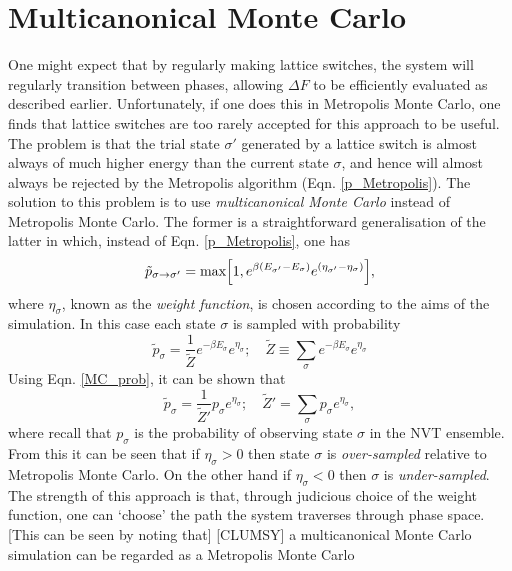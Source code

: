 \documentclass{report}
\begin{document}
\section{Multicanonical Monte Carlo}
One might expect that by regularly making lattice switches, the system will regularly transition between phases, allowing $\Delta F$ to be efficiently 
evaluated as described earlier. Unfortunately, if one does this in Metropolis Monte Carlo, one finds that lattice switches are too rarely accepted for 
this approach to be useful. 
The problem is that the trial state $\sigma'$ generated by a lattice switch is almost always of much higher energy than the current state $\sigma$, 
and hence will almost always be rejected by the Metropolis algorithm (Eqn. \eqref{p_Metropolis}). 
The solution to this problem is to use \emph{multicanonical Monte Carlo}\cite{Berg_1991,Berg_1992,Smith_1995} instead of Metropolis Monte Carlo. 
The former is a straightforward generalisation of the latter in which, instead of Eqn. \eqref{p_Metropolis}, one has
\begin{equation}\label{p_multicanonical}
\tilde{p}_{\sigma\to\sigma'}=\text{max}\Bigl[1,e^{\beta(E_{\sigma'}-E_{\sigma})}e^{(\eta_{\sigma'}-\eta_{\sigma})}\Bigr],
\end{equation}
where $\eta_{\sigma}$, known as the \emph{weight function}, is chosen according to the aims of the simulation. In this case each state $\sigma$ is 
sampled with probability
\begin{equation}\label{MCMC_prob}
\tilde{p}_{\sigma}=\frac{1}{\tilde{Z}}e^{-\beta E_{\sigma}}e^{\eta_{\sigma}}; \quad \tilde{Z}\equiv\sum_{\sigma}e^{-\beta E_{\sigma}}e^{\eta_{\sigma}}
\end{equation}
Using Eqn. \eqref{MC_prob}, it can be shown that
\begin{equation}\label{MCMC_prob_2}
\tilde{p}_{\sigma}=\frac{1}{\tilde{Z}'}p_{\sigma}e^{\eta_{\sigma}}; \quad \tilde{Z}'=\sum_{\sigma}p_{\sigma}e^{\eta_{\sigma}},
\end{equation}
where recall that $p_{\sigma}$ is the probability of observing state $\sigma$ in the NVT ensemble. From this it can be seen that if 
$\eta_{\sigma}>0$ then state $\sigma$ is \emph{over-sampled} relative to Metropolis Monte Carlo. On the other hand if $\eta_{\sigma}<0$ then 
$\sigma$ is \emph{under-sampled}. 
The strength of this approach is that, through judicious choice of the weight function, one can `choose' the path the system traverses 
through phase space. [This can be seen by noting that] [CLUMSY] a multicanonical Monte Carlo simulation can be regarded as a Metropolis Monte Carlo 
\end{document}
